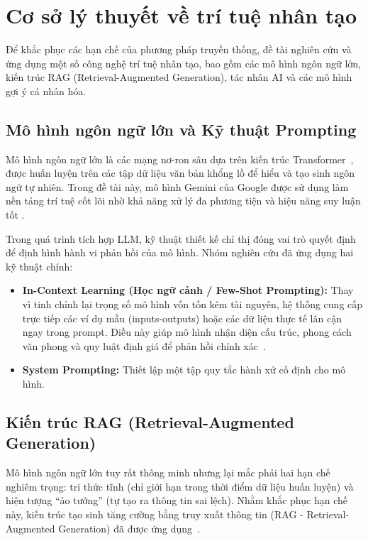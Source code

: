 \section{Cơ sở lý thuyết về trí tuệ nhân tạo}

Để khắc phục các hạn chế của phương pháp truyền thống, đề tài nghiên cứu và ứng dụng một số công nghệ trí tuệ nhân tạo, bao gồm các mô hình ngôn ngữ lớn, kiến trúc RAG (Retrieval-Augmented Generation), tác nhân AI và các mô hình gợi ý cá nhân hóa.

\FloatBarrier
\subsection{Mô hình ngôn ngữ lớn và Kỹ thuật Prompting}

Mô hình ngôn ngữ lớn là các mạng nơ-ron sâu dựa trên kiến trúc Transformer~\cite{Vaswani2017}, được huấn luyện trên các tập dữ liệu văn bản khổng lồ để hiểu và tạo sinh ngôn ngữ tự nhiên. Trong đề tài này, mô hình Gemini của Google được sử dụng làm nền tảng trí tuệ cốt lõi nhờ khả năng xử lý đa phương tiện và hiệu năng suy luận tốt \cite{GeminiDocs}.

Trong quá trình tích hợp LLM, kỹ thuật thiết kế chỉ thị đóng vai trò quyết định để định hình hành vi phản hồi của mô hình. Nhóm nghiên cứu đã ứng dụng hai kỹ thuật chính:
\begin{itemize}
    \item \textbf{In-Context Learning (Học ngữ cảnh / Few-Shot Prompting):} Thay vì tinh chỉnh lại trọng số mô hình vốn tốn kém tài nguyên, hệ thống cung cấp trực tiếp các ví dụ mẫu (inputs-outputs) hoặc các dữ liệu thực tế lân cận ngay trong prompt. Điều này giúp mô hình nhận diện cấu trúc, phong cách văn phong và quy luật định giá để phản hồi chính xác~\cite{Brown2020}.
    \item \textbf{System Prompting:} Thiết lập một tập quy tắc hành xử cố định cho mô hình.
\end{itemize}

\FloatBarrier
\subsection{Kiến trúc RAG (Retrieval-Augmented Generation)}

Mô hình ngôn ngữ lớn tuy rất thông minh nhưng lại mắc phải hai hạn chế nghiêm trọng: tri thức tĩnh (chỉ giới hạn trong thời điểm dữ liệu huấn luyện) và hiện tượng ``ảo tưởng'' (tự tạo ra thông tin sai lệch). Nhằm khắc phục hạn chế này, kiến trúc tạo sinh tăng cường bằng truy xuất thông tin (RAG - Retrieval-Augmented Generation) đã được ứng dụng~\cite{Lewis2020}.


